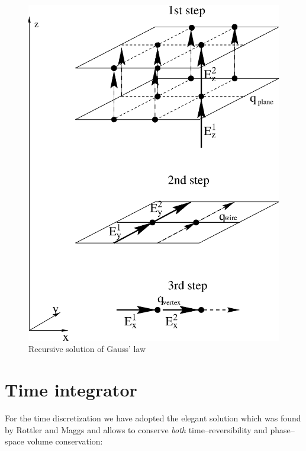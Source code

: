 \documentclass[a4paper, 12pt]{article}
\begin{document}
\begin{enumerate}
\begin{figure}
 \centering \includegraphics[scale=0.74]{figs/initializationE.eps}
 \caption{Recursive solution of Gauss' law} 
 \label{fig:initialization_E} 
\end{figure} 

%
\section{Time integrator}
%
For the time discretization we have adopted the elegant solution which was found by
Rottler and Maggs \cite{maggs_prl_1} and allows to conserve {\em both}
time--reversibility and phase--space volume conservation:


\end{enumerate}
\end{document}
